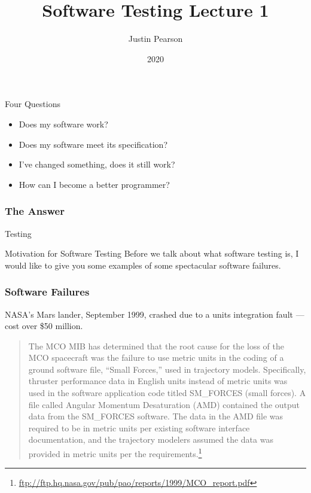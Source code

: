 \documentclass{beamer}
\title{Software Testing  Lecture 1}
\author{Justin Pearson}
\date{2020}
\begin{document}
\lstset{language=python}

\begin{frame}
  \maketitle
\end{frame}
\begin{frame}{Four Questions}
  \begin{itemize}
  \item Does my software work? \pause
  \item Does my software meet its specification? \pause
  \item I've changed something, does it still work? \pause
  \item How can I become a better programmer? 
  \end{itemize}
\end{frame}
\begin{frame}
  \frametitle{The Answer}
  \begin{center}
    {\Huge 
  Testing}
  \end{center}
\end{frame}
\begin{frame}{Motivation for Software Testing}
  Before we talk about what software testing is, I would like to give
  you some examples of some spectacular software failures.
  
  
\end{frame}
\begin{frame}
  \frametitle{Software Failures}

NASA's Mars lander, September 1999, crashed due to a units
    integration fault --- cost over  \$50 million.
    \begin{quote}
      The MCO MIB has determined that the root cause for the loss of
      the MCO spacecraft was the failure to use metric units in the
      coding of a ground software file, “Small Forces,” used in
      trajectory models. Specifically, thruster performance data in
      English units instead of metric units was used in the software
      application code titled SM\_FORCES (small forces). A file called
      Angular Momentum Desaturation (AMD) contained the output data
      from the SM\_FORCES software. The data in the AMD file was
      required to be in metric units per existing software interface
      documentation, and the trajectory modelers assumed the data was
      provided in metric units per the
      requirements.\footnote{\url{ftp://ftp.hq.nasa.gov/pub/pao/reports/1999/MCO_report.pdf}}
    \end{quote}  
\end{frame}
\end{document}
